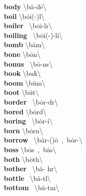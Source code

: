 \documentclass[10pt,a4paper]{article}
\begin{document}
\begin{multicols}{2}
\textbf{ body }\quad \textbackslash \textprimstress b\"{a}-d\={e}\textbackslash \\
\textbf{ boil }\quad \textbackslash \textprimstress b\.{o}i(-\textschwa )l\textbackslash \\
\textbf{ boiler }\quad \ \textbackslash \textprimstress b\.{o}i-l\textschwa r\textbackslash \\
\textbf{ boiling }\quad \ \textbackslash \textprimstress b\.{o}i(-\textschwa )-li\engma \textbackslash \\
\textbf{ bomb }\quad \textbackslash \textprimstress b\"{a}m\textbackslash \\
\textbf{ bone }\quad \textbackslash \textprimstress b\={o}n\textbackslash \\
\textbf{ bonus }\quad \ \textbackslash \textprimstress b\={o}-n\textschwa s\textbackslash \\
\textbf{ book }\quad \textbackslash \textprimstress bu\. k\textbackslash \\
\textbf{ boom }\quad \textbackslash \textprimstress b\"{u}m\textbackslash \\
\textbf{ boot }\quad \textbackslash \textprimstress b\"{u}t\textbackslash \\
\textbf{ border }\quad \ \textbackslash \textprimstress b\.{o}r-d\textschwa r\textbackslash \\
\textbf{ bored }\quad \textbackslash \textprimstress b\.{o}rd\textbackslash \\
\textbf{ boring }\quad \ \textbackslash \textprimstress b\.{o}r-i\engma \textbackslash \\
\textbf{ born }\quad \textbackslash \textprimstress b\.{o}rn\textbackslash \\
\textbf{ borrow }\quad \ \textbackslash \textprimstress b\"{a}r-(\textsecstress )\={o}\ ,\ \textprimstress b\.{o}r-\textbackslash \\
\textbf{ boss }\quad \textbackslash \textprimstress b\.{o}s\ ,\ \textprimstress b\"{a}s\textbackslash \\
\textbf{ both }\quad \textbackslash \textprimstress b\={o}th\textbackslash \\
\textbf{ bother }\quad \ \textbackslash \textprimstress b\"{a}- h\textschwa r\textbackslash \\
\textbf{ bottle }\quad \ \textbackslash \textprimstress b\"{a}-t\textsuperscript{\textreve}l\textbackslash \\
\textbf{ bottom }\quad \ \textbackslash \textprimstress b\"{a}-t\textschwa m\textbackslash \\

\end{multicols}
\end{document}
